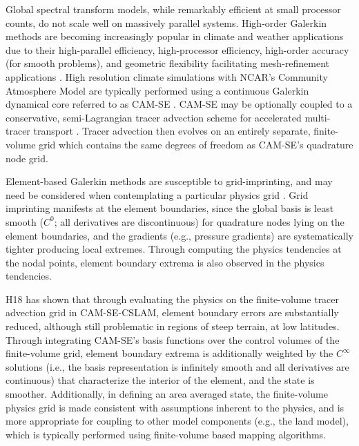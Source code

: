 \documentclass{agujournal}
\begin{document}
Global spectral transform models, while remarkably efficient at small processor counts, do not scale well on massively parallel systems. High-order Galerkin methods are becoming increasingly popular in climate and weather applications due to their high-parallel efficiency, high-processor efficiency, high-order accuracy (for smooth problems), and geometric flexibility facilitating mesh-refinement applications \citep[e.g.,][and the Energy Exascale Earth System Model; \url{https://e3sm.org/}]{Giraldo20083849,NCT2009CF,BSBDK2013TCFD}. High resolution climate simulations with NCAR's Community Atmosphere Model \citep[CAM;][]{CAM5} are typically performed using a continuous Galerkin dynamical core referred to as CAM-SE \citep[CAM Spectral Elements;][]{TES2008JPCS,DetAl2012IJHPCA,LetAl2018JAMES}. CAM-SE may be optionally coupled to a conservative, semi-Lagrangian tracer advection scheme for accelerated multi-tracer transport \citep[CAM-SE-CSLAM;][]{LTOUNGK2017MWR}. Tracer advection then evolves on an entirely separate, finite-volume grid which contains the same degrees of freedom as CAM-SE's quadrature node grid.

Element-based Galerkin methods are susceptible to grid-imprinting, and may need be considered when contemplating a particular physics grid \citep[][hereafter referred to as H18]{HL2018MWR}. Grid imprinting manifests at the element boundaries, since the global basis is least smooth ($C^{0}$; all derivatives are discontinuous) for quadrature nodes lying on the element boundaries, and the gradients (e.g., pressure gradients) are systematically tighter producing local extremes. Through computing the physics tendencies at the nodal points, element boundary extrema is also observed in the physics tendencies. 

H18 has shown that through evaluating the physics on the finite-volume tracer advection grid in CAM-SE-CSLAM, element boundary errors are substantially reduced, although still problematic in regions of steep terrain, at low latitudes. Through integrating CAM-SE's basis functions over the control volumes of the finite-volume grid, element boundary extrema is additionally weighted by the $C^{\infty}$ solutions (i.e., the basis representation is infinitely smooth and all derivatives are continuous) that characterize the interior of the element, and the state is smoother. Additionally, in defining an area averaged state, the finite-volume physics grid is made consistent with assumptions inherent to the physics, and is more appropriate for coupling to other model components (e.g., the land model), which is typically performed using finite-volume based mapping algorithms.
\end{document}
